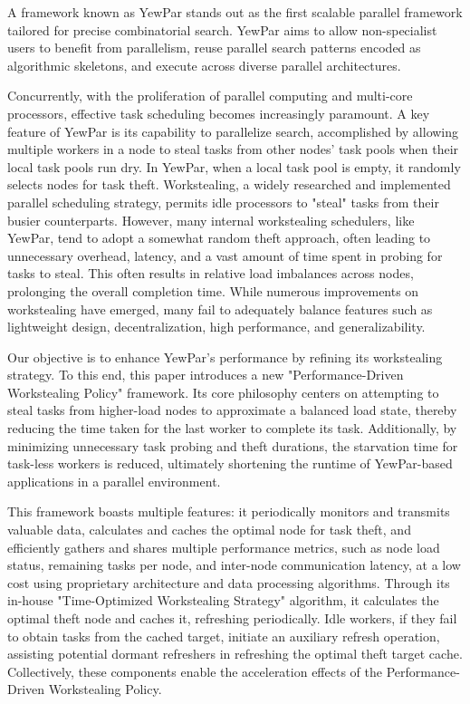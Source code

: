 \documentclass{mproj}
\begin{document}
A framework known as YewPar\cite{10.1145/3332466.3374537} stands out as the first scalable parallel framework tailored for precise combinatorial search.
YewPar aims to allow non-specialist users to benefit from parallelism,
reuse parallel search patterns encoded as algorithmic skeletons,
and execute across diverse parallel architectures.

Concurrently, with the proliferation of parallel computing and multi-core processors, effective task scheduling becomes increasingly paramount.
A key feature of YewPar is its capability to parallelize search, accomplished by allowing multiple workers in a node to steal tasks from other nodes' task pools when their local task pools run dry.
In YewPar, when a local task pool is empty, it randomly selects nodes for task theft.
Workstealing, a widely researched and implemented parallel scheduling strategy, permits idle processors to "steal" tasks from their busier counterparts.
However, many internal workstealing schedulers, like YewPar, tend to adopt a somewhat random theft approach, often leading to unnecessary overhead, latency, and a vast amount of time spent in probing for tasks to steal.
This often results in relative load imbalances across nodes, prolonging the overall completion time.
While numerous improvements on workstealing have emerged, many fail to adequately balance features such as lightweight design, decentralization, high performance, and generalizability.

Our objective is to enhance YewPar's performance by refining its workstealing strategy.
To this end, this paper introduces a new "Performance-Driven Workstealing Policy" framework.
Its core philosophy centers on attempting to steal tasks from higher-load nodes to approximate a balanced load state, thereby reducing the time taken for the last worker to complete its task.
Additionally, by minimizing unnecessary task probing and theft durations, the starvation time for task-less workers is reduced,
ultimately shortening the runtime of YewPar-based applications in a parallel environment.

This framework boasts multiple features:
it periodically monitors and transmits valuable data,
calculates and caches the optimal node for task theft,
and efficiently gathers and shares multiple performance metrics, such as node load status, remaining tasks per node, and inter-node communication latency, at a low cost using proprietary architecture and data processing algorithms.
Through its in-house "Time-Optimized Workstealing Strategy" algorithm, it calculates the optimal theft node and caches it, refreshing periodically.
Idle workers, if they fail to obtain tasks from the cached target, initiate an auxiliary refresh operation, assisting potential dormant refreshers in refreshing the optimal theft target cache.
Collectively, these components enable the acceleration effects of the Performance-Driven Workstealing Policy.
\end{document}
